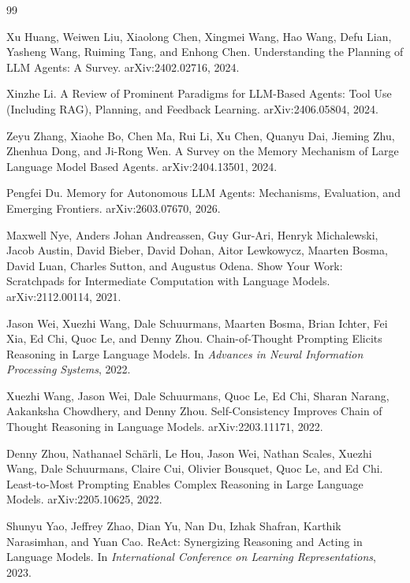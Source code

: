 \documentclass{article}
\begin{document}

\begin{thebibliography}{99}

Xu Huang, Weiwen Liu, Xiaolong Chen, Xingmei Wang, Hao Wang, Defu Lian, Yasheng Wang, Ruiming Tang, and Enhong Chen.
\newblock Understanding the Planning of LLM Agents: A Survey.
\newblock arXiv:2402.02716, 2024.

Xinzhe Li.
\newblock A Review of Prominent Paradigms for LLM-Based Agents: Tool Use (Including RAG), Planning, and Feedback Learning.
\newblock arXiv:2406.05804, 2024.

Zeyu Zhang, Xiaohe Bo, Chen Ma, Rui Li, Xu Chen, Quanyu Dai, Jieming Zhu, Zhenhua Dong, and Ji-Rong Wen.
\newblock A Survey on the Memory Mechanism of Large Language Model Based Agents.
\newblock arXiv:2404.13501, 2024.

Pengfei Du.
\newblock Memory for Autonomous LLM Agents: Mechanisms, Evaluation, and Emerging Frontiers.
\newblock arXiv:2603.07670, 2026.

Maxwell Nye, Anders Johan Andreassen, Guy Gur-Ari, Henryk Michalewski, Jacob Austin, David Bieber, David Dohan, Aitor Lewkowycz, Maarten Bosma, David Luan, Charles Sutton, and Augustus Odena.
\newblock Show Your Work: Scratchpads for Intermediate Computation with Language Models.
\newblock arXiv:2112.00114, 2021.

Jason Wei, Xuezhi Wang, Dale Schuurmans, Maarten Bosma, Brian Ichter, Fei Xia, Ed Chi, Quoc Le, and Denny Zhou.
\newblock Chain-of-Thought Prompting Elicits Reasoning in Large Language Models.
\newblock In \emph{Advances in Neural Information Processing Systems}, 2022.

Xuezhi Wang, Jason Wei, Dale Schuurmans, Quoc Le, Ed Chi, Sharan Narang, Aakanksha Chowdhery, and Denny Zhou.
\newblock Self-Consistency Improves Chain of Thought Reasoning in Language Models.
\newblock arXiv:2203.11171, 2022.

Denny Zhou, Nathanael Sch\"arli, Le Hou, Jason Wei, Nathan Scales, Xuezhi Wang, Dale Schuurmans, Claire Cui, Olivier Bousquet, Quoc Le, and Ed Chi.
\newblock Least-to-Most Prompting Enables Complex Reasoning in Large Language Models.
\newblock arXiv:2205.10625, 2022.

Shunyu Yao, Jeffrey Zhao, Dian Yu, Nan Du, Izhak Shafran, Karthik Narasimhan, and Yuan Cao.
\newblock ReAct: Synergizing Reasoning and Acting in Language Models.
\newblock In \emph{International Conference on Learning Representations}, 2023.


\end{thebibliography}
\end{document}
